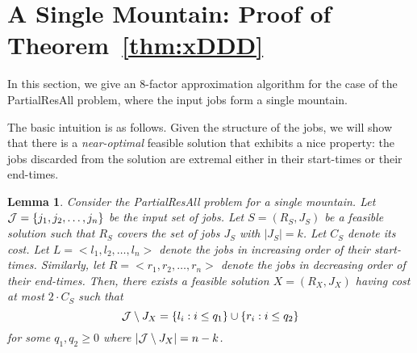 \documentclass[11pt]{article}
\newtheorem{lemma}[theorem]{Lemma}
\newcommand{\J}{{\cal J}}
\newcommand{\PResAll}{{\sc PartialResAll}}
\newcommand{\cJ}{{\cal J}}
\begin{document}
\section{A Single Mountain: Proof of Theorem~\ref{thm:xDDD}}
\label{sec:mountain}
In this section, we give an $8$-factor approximation algorithm for the case of the {\PResAll} problem,
where the input jobs form a single mountain. 

The basic intuition is as follows. Given the structure of the jobs, we will show that there is a
{\em near-optimal} feasible solution that exhibits a nice property: 
the jobs discarded from the solution are extremal either in their
start-times or their end-times. 

\begin{lemma}
\label{BBB}
Consider the {\PResAll} problem for a single mountain.
Let $\J = \{ j_1, j_2, \ldots, j_n \}$ be the input set of jobs.
Let $S=(R_S, J_S)$ be a feasible solution such that $R_S$ covers the set of jobs $J_S$ with $|J_S|=k$. 
Let $C_S$ denote its cost.
Let $L = < l_1, l_2, \ldots, l_n >$ denote the jobs in increasing order of their start-times.
Similarly, let $R = < r_1, r_2, \ldots, r_n >$ denote the jobs in decreasing order of their end-times.
Then, there exists a feasible solution $X=(R_X, J_X)$ having cost at most $2 \cdot C_S$ such that
\begin{equation}\label{eqn:aa}
{\J} \setminus J_X = \{ {l_i} : i \le q_1 \} \cup \{ {r_i} : i \le q_2 \}
\end{equation}
for some $q_1,q_2 \ge 0$ where $|\cJ \setminus J_X|=n-k$.
\end{lemma}
\end{document}
